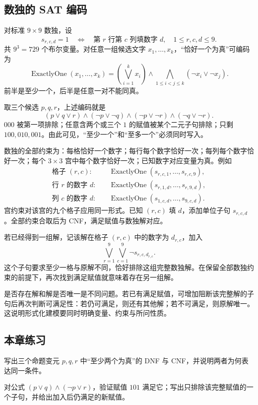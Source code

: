 \documentclass[UTF8,fontset=none,zihao=-4,a4paper]{ctexart}
\begin{document}
\subsection{数独的 SAT 编码}
对标准 $9\times9$ 数独，设
\[
s_{r,c,d}=1\quad\Longleftrightarrow\quad
\text{第 }r\text{ 行第 }c\text{ 列填数字 }d,
\quad1\le r,c,d\le9.
\]
共 $9^3=729$ 个布尔变量。对任意一组候选文字 $x_1,\ldots,x_k$，“恰好一个为真”可编码为
\[
\operatorname{ExactlyOne}(x_1,\ldots,x_k)
=\left(\bigvee_{i=1}^{k}x_i\right)
\land\bigwedge_{1\le i<j\le k}(\neg x_i\lor\neg x_j).
\]
前半是至少一个，后半是任意一对不能同真。

取三个候选 $p,q,r$，上述编码就是
\[
(p\lor q\lor r)\land(\neg p\lor\neg q)
\land(\neg p\lor\neg r)\land(\neg q\lor\neg r).
\]
$000$ 被第一项排除；任意含两个或三个 $1$ 的赋值被某个二元子句排除；只剩 $100,010,001$。由此可见，“至少一个”和“至多一个”必须同时写入。

数独的全部约束为：每格恰好一个数字；每行每个数字恰好一次；每列每个数字恰好一次；每个 $3\times3$ 宫中每个数字恰好一次；已知数字对应变量为真。例如
\begin{align*}
\text{格子 }(r,c):&\quad\operatorname{ExactlyOne}(s_{r,c,1},\ldots,s_{r,c,9}),\\
\text{行 }r\text{ 的数字 }d:&\quad\operatorname{ExactlyOne}(s_{r,1,d},\ldots,s_{r,9,d}),\\
\text{列 }c\text{ 的数字 }d:&\quad\operatorname{ExactlyOne}(s_{1,c,d},\ldots,s_{9,c,d}).
\end{align*}
宫约束对该宫的九个格子应用同一形式。已知 $(r,c)$ 填 $d$，添加单位子句 $s_{r,c,d}$。全部约束合取后为 CNF，满足赋值与数独解对应。

若已经得到一组解，记该解在格子 $(r,c)$ 中的数字为 $d_{r,c}$，加入
\[
\bigvee_{r=1}^{9}\bigvee_{c=1}^{9}\neg s_{r,c,d_{r,c}}.
\]
这个子句要求至少一格与原解不同，恰好排除这组完整数独解。在保留全部数独约束的前提下，再次找到满足赋值就意味着存在另一组解。

是否存在解和解是否唯一是不同问题。若已有满足赋值，可增加阻断该完整解的子句后再次判断可满足性：若仍可满足，则还有其他解；若不可满足，则原解唯一。这说明形式化建模要同时明确变量、约束与所问性质。

\subsection{本章练习}
\begin{enumerate}[label=12.\arabic*.,leftmargin=2.8em]
\begin{samepage}
\item 写出三个命题变元 $p,q,r$ 中“至少两个为真”的 DNF 与 CNF，并说明两者为何表达同一条件。
\end{samepage}
\begin{samepage}
\item 对公式 $(p\lor q)\land(\neg p\lor r)$，验证赋值 $101$ 满足它；写出只排除该完整赋值的一个子句，并给出加入后仍满足的新赋值。
\end{samepage}
\end{enumerate}
\end{document}
